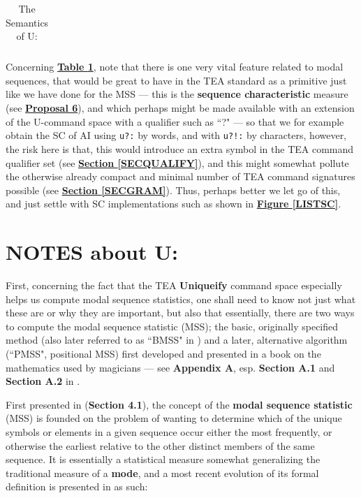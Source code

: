 \documentclass[a4paper, 18pt]{book} %
\begin{document}
{{{\begin{table}[H]
\begin{tabular}{>{\bfseries}m{0.4\linewidth} | m{0.6\linewidth}}
 \hline
\end{tabular}
\caption{The Semantics of U:}
\label{TABSEMU}
\end{table}

Concerning \textbf{\hyperref[TABSEMU]{Table \ref{TABSEMU}}}, note that there is one very vital feature related to modal sequences, that would be great to have in the TEA standard as a primitive just like we have done for the MSS --- this is the \textbf{sequence characteristic} measure (see \textbf{\hyperref[PROP6]{Proposal 6}}), and which perhaps might be made available with an extension of the U-command space with a qualifier such as ``?" --- so that we for example obtain the SC of AI using \texttt{u?:} by words, and with \texttt{u?!:} by characters, however, the risk here is that, this would introduce an extra symbol in the TEA command qualifier set (see \textbf{\hyperref[SECQUALIFY]{Section \ref{SECQUALIFY}}}), and this might somewhat pollute the otherwise already compact and minimal number of TEA command signatures possible (see \textbf{\hyperref[SECGRAM]{Section \ref{SECGRAM}}}). Thus, perhaps better we let go of this, and just settle with SC implementations such as shown in \textbf{\hyperref[LISTSC]{Figure \ref{LISTSC}}}.


\section{NOTES about U:}
\label{SECNOTEU} 
 
 
 First, concerning the fact that the TEA \textbf{Uniqueify} command space especially helps us compute modal sequence statistics, one shall need to know not just what these are or why they are important, but also that essentially, there are two ways to compute the modal sequence statistic (MSS); the basic, originally specified method\cite{transformatics} (also later referred to as ``BMSS" in \cite{lutalo_2025_grimlumtauto}) and a later, alternative algorithm (``PMSS", positional MSS) first developed and presented in a book on the mathematics used by magicians --- see \textbf{Appendix A}, esp. \textbf{Section A.1} and \textbf{Section A.2} in \cite{lutalo_2025_grimlumtauto}.
 
 
 \vspace{2em}
 
 
 First presented in \cite{transformatics} (\textbf{Section 4.1}), the concept of the \textbf{modal sequence statistic} (MSS) is founded on the problem of wanting to determine which of the unique symbols or elements in a given sequence occur either the most frequently, or otherwise the earliest relative to the other distinct members of the same sequence. It is essentially a statistical measure somewhat generalizing the traditional measure of a \textbf{mode}, and a most recent evolution of its formal definition is presented in \cite{lutalo_2025_trans_genetics} as such:
 
}}}
\end{document}
